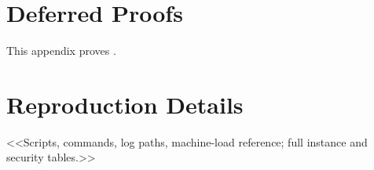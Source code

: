 \section{Deferred Proofs}\label{app:proofs}
This appendix proves .

\section{Reproduction Details}\label{app:repro}
<<Scripts, commands, log paths, machine-load reference; full instance and security tables.>>
